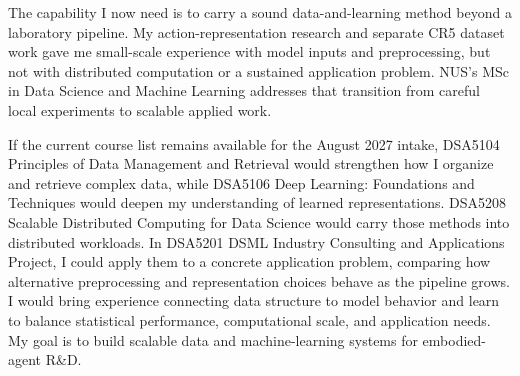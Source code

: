 The capability I now need is to carry a sound data-and-learning method beyond a laboratory pipeline. My action-representation research and separate CR5 dataset work gave me small-scale experience with model inputs and preprocessing, but not with distributed computation or a sustained application problem. NUS's MSc in Data Science and Machine Learning addresses that transition from careful local experiments to scalable applied work.

If the current course list remains available for the August 2027 intake, DSA5104 Principles of Data Management and Retrieval would strengthen how I organize and retrieve complex data, while DSA5106 Deep Learning: Foundations and Techniques would deepen my understanding of learned representations. DSA5208 Scalable Distributed Computing for Data Science would carry those methods into distributed workloads. In DSA5201 DSML Industry Consulting and Applications Project, I could apply them to a concrete application problem, comparing how alternative preprocessing and representation choices behave as the pipeline grows. I would bring experience connecting data structure to model behavior and learn to balance statistical performance, computational scale, and application needs. My goal is to build scalable data and machine-learning systems for embodied-agent R\&D.
